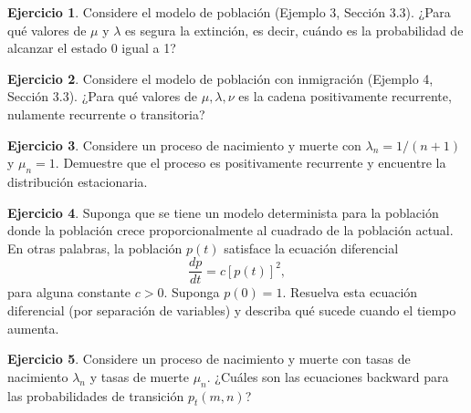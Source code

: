 \documentclass{article}
\theoremstyle{plain}
\theoremstyle{definition}
\newtheorem{Ejercicio}{Ejercicio}[section]
\begin{document}
\begin{Ejercicio}
  Considere el modelo de poblaci\'on (Ejemplo 3, Secci\'on 3.3). ¿Para qu\'e valores de $\mu$ y $\lambda$ es segura la extinci\'on, es decir, cu\'ando es la probabilidad de alcanzar el estado 0 igual a 1?
\end{Ejercicio}

\begin{Ejercicio}
  Considere el modelo de poblaci\'on con inmigraci\'on (Ejemplo 4, Secci\'on 3.3). ¿Para qu\'e valores de $\mu, \lambda, \nu$ es la cadena positivamente recurrente, nulamente recurrente o transitoria?
\end{Ejercicio}

\begin{Ejercicio}
  Considere un proceso de nacimiento y muerte con $\lambda_n = 1/(n+1)$ y $\mu_n = 1$. Demuestre que el proceso es positivamente recurrente y encuentre la distribuci\'on estacionaria.
\end{Ejercicio}

\begin{Ejercicio}
  Suponga que se tiene un modelo determinista para la poblaci\'on donde la poblaci\'on crece proporcionalmente al cuadrado de la poblaci\'on actual. En otras palabras, la poblaci\'on $p(t)$ satisface la ecuaci\'on diferencial
  \[ \frac{dp}{dt} = c[p(t)]^2, \]
  para alguna constante $c > 0$. Suponga $p(0) = 1$. Resuelva esta ecuaci\'on diferencial (por separaci\'on de variables) y describa qu\'e sucede cuando el tiempo aumenta.
\end{Ejercicio}

\begin{Ejercicio}
  Considere un proceso de nacimiento y muerte con tasas de nacimiento $\lambda_n$ y tasas de muerte $\mu_n$. ¿Cu\'ales son las ecuaciones backward para las probabilidades de transici\'on $p_t(m,n)$?
\end{Ejercicio}
\end{document}
